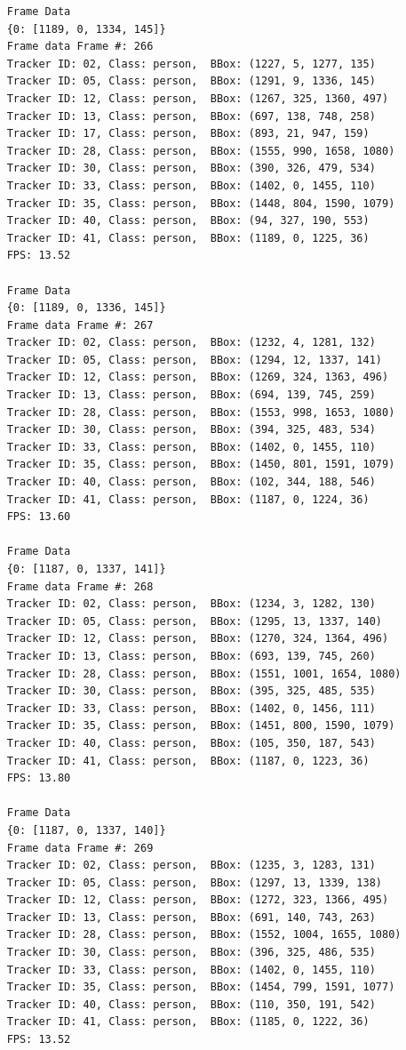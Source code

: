 \documentclass{fisatprojectfinal}
\begin{document}
\begin{verbatim}
    Frame Data
    {0: [1189, 0, 1334, 145]}
    Frame data Frame #: 266
    Tracker ID: 02, Class: person,  BBox: (1227, 5, 1277, 135)
    Tracker ID: 05, Class: person,  BBox: (1291, 9, 1336, 145)
    Tracker ID: 12, Class: person,  BBox: (1267, 325, 1360, 497)
    Tracker ID: 13, Class: person,  BBox: (697, 138, 748, 258)
    Tracker ID: 17, Class: person,  BBox: (893, 21, 947, 159)
    Tracker ID: 28, Class: person,  BBox: (1555, 990, 1658, 1080)
    Tracker ID: 30, Class: person,  BBox: (390, 326, 479, 534)
    Tracker ID: 33, Class: person,  BBox: (1402, 0, 1455, 110)
    Tracker ID: 35, Class: person,  BBox: (1448, 804, 1590, 1079)
    Tracker ID: 40, Class: person,  BBox: (94, 327, 190, 553)
    Tracker ID: 41, Class: person,  BBox: (1189, 0, 1225, 36)
    FPS: 13.52
    
    Frame Data
    {0: [1189, 0, 1336, 145]}
    Frame data Frame #: 267
    Tracker ID: 02, Class: person,  BBox: (1232, 4, 1281, 132)
    Tracker ID: 05, Class: person,  BBox: (1294, 12, 1337, 141)
    Tracker ID: 12, Class: person,  BBox: (1269, 324, 1363, 496)
    Tracker ID: 13, Class: person,  BBox: (694, 139, 745, 259)
    Tracker ID: 28, Class: person,  BBox: (1553, 998, 1653, 1080)
    Tracker ID: 30, Class: person,  BBox: (394, 325, 483, 534)
    Tracker ID: 33, Class: person,  BBox: (1402, 0, 1455, 110)
    Tracker ID: 35, Class: person,  BBox: (1450, 801, 1591, 1079)
    Tracker ID: 40, Class: person,  BBox: (102, 344, 188, 546)
    Tracker ID: 41, Class: person,  BBox: (1187, 0, 1224, 36)
    FPS: 13.60
    
    Frame Data
    {0: [1187, 0, 1337, 141]}
    Frame data Frame #: 268
    Tracker ID: 02, Class: person,  BBox: (1234, 3, 1282, 130)
    Tracker ID: 05, Class: person,  BBox: (1295, 13, 1337, 140)
    Tracker ID: 12, Class: person,  BBox: (1270, 324, 1364, 496)
    Tracker ID: 13, Class: person,  BBox: (693, 139, 745, 260)
    Tracker ID: 28, Class: person,  BBox: (1551, 1001, 1654, 1080)
    Tracker ID: 30, Class: person,  BBox: (395, 325, 485, 535)
    Tracker ID: 33, Class: person,  BBox: (1402, 0, 1456, 111)
    Tracker ID: 35, Class: person,  BBox: (1451, 800, 1590, 1079)
    Tracker ID: 40, Class: person,  BBox: (105, 350, 187, 543)
    Tracker ID: 41, Class: person,  BBox: (1187, 0, 1223, 36)
    FPS: 13.80
    
    Frame Data
    {0: [1187, 0, 1337, 140]}
    Frame data Frame #: 269
    Tracker ID: 02, Class: person,  BBox: (1235, 3, 1283, 131)
    Tracker ID: 05, Class: person,  BBox: (1297, 13, 1339, 138)
    Tracker ID: 12, Class: person,  BBox: (1272, 323, 1366, 495)
    Tracker ID: 13, Class: person,  BBox: (691, 140, 743, 263)
    Tracker ID: 28, Class: person,  BBox: (1552, 1004, 1655, 1080)
    Tracker ID: 30, Class: person,  BBox: (396, 325, 486, 535)
    Tracker ID: 33, Class: person,  BBox: (1402, 0, 1455, 110)
    Tracker ID: 35, Class: person,  BBox: (1454, 799, 1591, 1077)
    Tracker ID: 40, Class: person,  BBox: (110, 350, 191, 542)
    Tracker ID: 41, Class: person,  BBox: (1185, 0, 1222, 36)
    FPS: 13.52
    

\end{verbatim}
\end{document}
